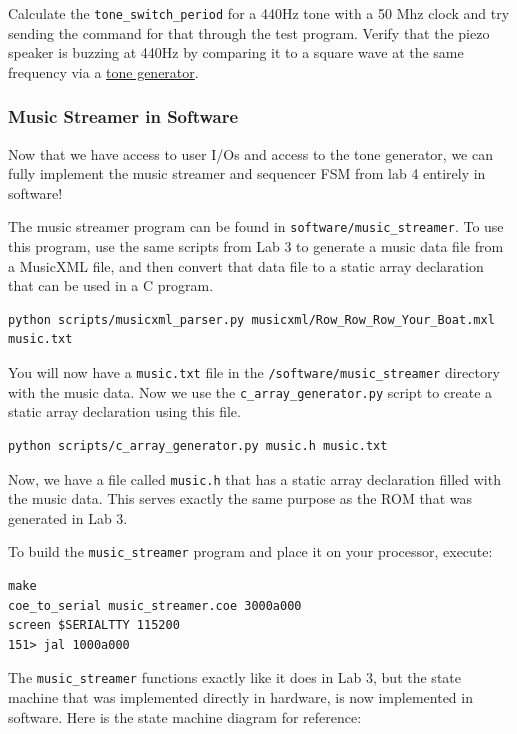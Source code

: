 \documentclass[11pt]{article}
\begin{document}
Calculate the \verb|tone_switch_period| for a 440Hz tone with a 50 Mhz clock and try sending the command for that through the test program. Verify that the piezo speaker is buzzing at 440Hz by comparing it to a square wave at the same frequency via a \href{http://onlinetonegenerator.com/}{tone generator}.

\subsubsection{Music Streamer in Software}
Now that we have access to user I/Os and access to the tone generator, we can fully implement the music streamer and sequencer FSM from lab 4 entirely in software!

The music streamer program can be found in \verb|software/music_streamer|. To use this program, use the same scripts from Lab 3 to generate a music data file from a MusicXML file, and then convert that data file to a static array declaration that can be used in a C program.

\begin{verbatim}
python scripts/musicxml_parser.py musicxml/Row_Row_Row_Your_Boat.mxl music.txt
\end{verbatim}

You will now have a \verb|music.txt| file in the \verb|/software/music_streamer| directory with the music data. Now we use the \verb|c_array_generator.py| script to create a static array declaration using this file.

\begin{verbatim}
python scripts/c_array_generator.py music.h music.txt
\end{verbatim}

Now, we have a file called \verb|music.h| that has a static array declaration filled with the music data. This serves exactly the same purpose as the ROM that was generated in Lab 3.

To build the \verb|music_streamer| program and place it on your processor, execute:
\begin{verbatim}
make
coe_to_serial music_streamer.coe 3000a000
screen $SERIALTTY 115200
151> jal 1000a000
\end{verbatim}

The \verb|music_streamer| functions exactly like it does in Lab 3, but the state machine that was implemented directly in hardware, is now implemented in software. Here is the state machine diagram for reference:
\end{document}
